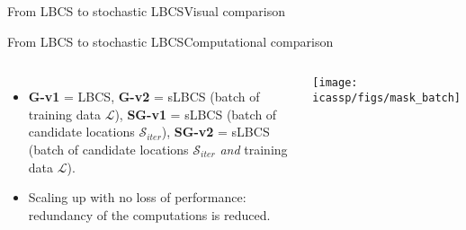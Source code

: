 \begin{frame}[t]{From LBCS to stochastic LBCS}{Visual comparison}
  \begin{minipage}[h]{\linewidth}
      \centering
      \vspace{-.3cm}
      \hspace{0.2cm}
  \end{minipage}
  \vfill
  \begin{minipage}[h]{\linewidth}
      \centering
      
      
      
      \hspace{0.2cm}
  \end{minipage}
  \end{frame}


  \begin{frame}[t]{From LBCS to stochastic LBCS}{Computational comparison}
    \begin{columns}[totalwidth=\textwidth]
      \begin{itemize}
        \item \textbf{G-v1} = LBCS, \textbf{G-v2} = sLBCS (batch of training data $\mathcal{L}$), \textbf{SG-v1} = sLBCS (batch of candidate locations $\mathcal{S}_{iter}$), \textbf{SG-v2} = sLBCS (batch of candidate locations $\mathcal{S}_{iter}$ \textit{and} training data $\mathcal{L}$).
        \item Scaling up with no loss of performance: redundancy of the computations is reduced.
        \end{itemize}
      \centering
      \texttt{[image: icassp/figs/mask\_batch]}
    \end{columns}
    
    \end{frame}

